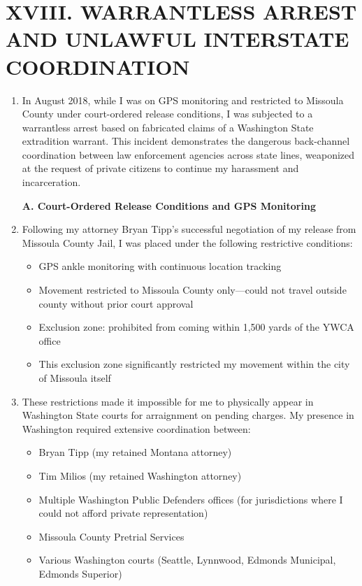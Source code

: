 \documentclass[12pt,letterpaper]{article}
\begin{document}
\section*{XVIII. WARRANTLESS ARREST AND UNLAWFUL INTERSTATE COORDINATION}

\begin{enumerate}

\item In August 2018, while I was on GPS monitoring and restricted to Missoula County under court-ordered release conditions, I was subjected to a warrantless arrest based on fabricated claims of a Washington State extradition warrant. This incident demonstrates the dangerous back-channel coordination between law enforcement agencies across state lines, weaponized at the request of private citizens to continue my harassment and incarceration.

\textbf{A. Court-Ordered Release Conditions and GPS Monitoring}

\item Following my attorney Bryan Tipp's successful negotiation of my release from Missoula County Jail, I was placed under the following restrictive conditions:

\begin{itemize}
\item GPS ankle monitoring with continuous location tracking
\item Movement restricted to Missoula County only---could not travel outside county without prior court approval
\item Exclusion zone: prohibited from coming within 1,500 yards of the YWCA office
\item This exclusion zone significantly restricted my movement within the city of Missoula itself
\end{itemize}

\item These restrictions made it impossible for me to physically appear in Washington State courts for arraignment on pending charges. My presence in Washington required extensive coordination between:

\begin{itemize}
\item Bryan Tipp (my retained Montana attorney)
\item Tim Milios (my retained Washington attorney)
\item Multiple Washington Public Defenders offices (for jurisdictions where I could not afford private representation)
\item Missoula County Pretrial Services
\item Various Washington courts (Seattle, Lynnwood, Edmonds Municipal, Edmonds Superior)
\end{itemize}


\end{enumerate}
\end{document}
